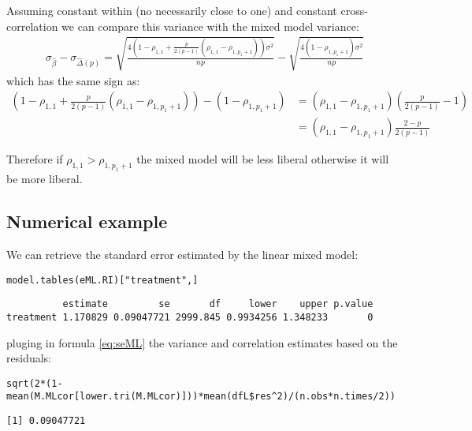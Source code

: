 \documentclass[12pt]{article}
\begin{document}
Assuming constant within (no necessarily close to one) and constant
cross-correlation we can compare this variance with the mixed model
variance:
\begin{align*}
\sigma_{\widehat{\beta}} - \sigma_{\widehat{\Delta}(p)} = \sqrt{\frac{4\left(1-\rho_{1,1} + \frac{p}{2(p-1)}(\rho_{1,1}-\rho_{1,p_1+1})\right) \sigma^2}{n p}} -  \sqrt{\frac{4(1-\rho_{1,p_1+1}) \sigma^2}{np}}
\end{align*}
which has the same sign as:
\begin{align*}
\left(1-\rho_{1,1} + \frac{p}{2(p-1)}(\rho_{1,1}-\rho_{1,p_1+1})\right) - (1-\rho_{1,p_1+1})
& = (\rho_{1,1}-\rho_{1,p_1+1}) \left(\frac{p}{2(p-1)} - 1 \right) \\
& = (\rho_{1,1}-\rho_{1,p_1+1}) \frac{2-p}{2(p-1)} 
\end{align*}

Therefore if \(\rho_{1,1}>\rho_{1,p_1+1}\) the mixed model will be
less liberal otherwise it will be more liberal.

\subsection{Numerical example}
\label{sec:org20afe35}

We can retrieve the standard error estimated by the linear mixed model:
\lstset{language=r,label= ,caption= ,captionpos=b,numbers=none}
\begin{lstlisting}
model.tables(eML.RI)["treatment",]
\end{lstlisting}

\begin{verbatim}
          estimate         se       df     lower    upper p.value
treatment 1.170829 0.09047721 2999.845 0.9934256 1.348233       0
\end{verbatim}


pluging in formula \autoref{eq:seML} the variance and correlation
estimates based on the residuals:
\lstset{language=r,label= ,caption= ,captionpos=b,numbers=none}
\begin{lstlisting}
sqrt(2*(1-mean(M.MLcor[lower.tri(M.MLcor)]))*mean(dfL$res^2)/(n.obs*n.times/2))
\end{lstlisting}

\begin{verbatim}
[1] 0.09047721
\end{verbatim}




\clearpage

\appendix
\end{document}
